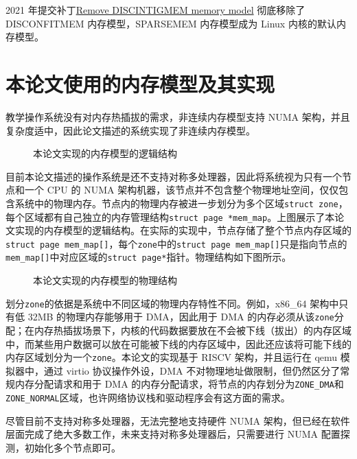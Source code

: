 \documentclass[AutoFakeBold]{LZUThesis}
\begin{document}
\begin{sloppypar}
2021 年提交补丁\href{https://lwn.net/Articles/858333}{Remove
DISCINTIGMEM memory model} 彻底移除了 DISCONFITMEM 内存模型，SPARSEMEM
内存模型成为 Linux 内核的默认内存模型。


\section{本论文使用的内存模型及其实现}

教学操作系统没有对内存热插拔的需求，非连续内存模型支持 NUMA
架构，并且复杂度适中，因此论文描述的系统实现了非连续内存模型。

\begin{figure}[htb]
\centering

\caption{本论文实现的内存模型的逻辑结构}
\end{figure}

目前本论文描述的操作系统是还不支持对称多处理器，因此将系统视为只有一个节点和一个
CPU 的 NUMA
架构机器，该节点并不包含整个物理地址空间，仅仅包含系统中的物理内存。节点内的物理内存被进一步划分为多个区域\texttt{struct\ zone}，每个区域都有自己独立的内存管理结构\texttt{struct\ page\ *mem\_map}。上图展示了本论文实现的内存模型的逻辑结构。在实际的实现中，节点存储了整个节点内存区域的\texttt{struct\ page\ mem\_map{[}{]}}，每个\texttt{zone}中的\texttt{struct\ page\ mem\_map{[}{]}}只是指向节点的\texttt{mem\_map{[}{]}}中对应区域的\texttt{struct\ page*}指针。物理结构如下图所示。

\begin{figure}[htb]
\centering

\caption{本论文实现的内存模型的物理结构}
\end{figure}

划分\texttt{zone}的依据是系统中不同区域的物理内存特性不同。例如，x86\_64
架构中只有低 32MB 的物理内存能够用于 DMA，因此用于 DMA
的内存必须从该\texttt{zone}分配；在内存热插拔场景下，内核的代码数据要放在不会被下线（拔出）的内存区域中，而某些用户数据可以放在可能被下线的内存区域中，因此还应该将可能下线的内存区域划分为一个\texttt{zone}。本论文的实现基于
RISCV 架构，并且运行在 qemu 模拟器中，通过 virtio 协议操作外设，DMA
不对物理地址做限制，但仍然区分了常规内存分配请求和用于 DMA
的内存分配请求，将节点的内存划分为\texttt{ZONE\_DMA}和\texttt{ZONE\_NORMAL}区域，也许网络协议栈和驱动程序会有这方面的需求。

尽管目前不支持对称多处理器，无法完整地支持硬件 NUMA
架构，但已经在软件层面完成了绝大多数工作，未来支持对称多处理器后，只需要进行
NUMA 配置探测，初始化多个节点即可。


\end{sloppypar}
\end{document}
